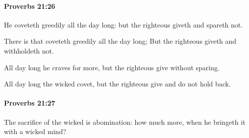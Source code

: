 		\paragraph{Proverbs 21:26} %
			\label{PROVERBS-21-26}

			He coveteth greedily all the day long: but the righteous giveth and spareth not.

			\begin{versebox}
					\item[BHS] 
					\item[ASV] There is that coveteth greedily all the day long; But the righteous giveth and withholdeth not.
					\item[NIV] All day long he craves for more, but the righteous give without sparing.
					\item[NRSV] All day long the wicked covet, but the righteous give and do not hold back.
			\end{versebox}

		\paragraph{Proverbs 21:27} %
			\label{PROVERBS-21-27}

			The sacrifice of the wicked is abomination: how much more, when he bringeth it with a wicked mind?


